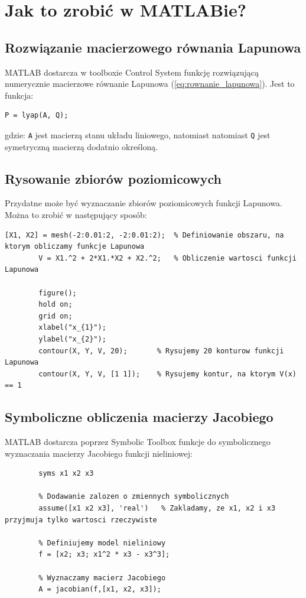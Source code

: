 \documentclass{article}
\begin{document}
\section{Jak to zrobić w MATLABie?}
    \subsection{Rozwiązanie macierzowego równania Lapunowa}
    MATLAB dostarcza w toolboxie Control System funkcję rozwiązującą numerycznie macierzowe równanie Lapunowa (\ref{eq:rownanie_lapunowa}).
    Jest to funkcja:
    \begin{lstlisting}[style=Matlab-editor]
        P = lyap(A, Q);
    \end{lstlisting}
    gdzie: \texttt{A} jest macierzą stanu układu liniowego, natomiast natomiast \texttt{Q} jest symetryczną macierzą dodatnio określoną.

    \subsection{Rysowanie zbiorów poziomicowych}
    Przydatne może być wyznaczanie zbiorów poziomicowych funkcji Lapunowa.
    Można to zrobić w następujący sposób:
    \begin{lstlisting}[style=Matlab-editor]
        [X1, X2] = mesh(-2:0.01:2, -2:0.01:2);  % Definiowanie obszaru, na ktorym obliczamy funkcje Lapunowa
        V = X1.^2 + 2*X1.*X2 + X2.^2;   % Obliczenie wartosci funkcji Lapunowa

        figure();
        hold on;
        grid on;
        xlabel("x_{1}");
        ylabel("x_{2}");
        contour(X, Y, V, 20);       % Rysujemy 20 konturow funkcji Lapunowa
        contour(X, Y, V, [1 1]);    % Rysujemy kontur, na ktorym V(x) == 1
    \end{lstlisting}

    \subsection{Symboliczne obliczenia macierzy Jacobiego}
    MATLAB dostarcza poprzez Symbolic Toolbox funkcje do symbolicznego wyznaczania macierzy Jacobiego funkcji nieliniowej:
    \begin{lstlisting}[style=Matlab-editor]
        % Definiowanie zmiennych symbolicznych
        syms x1 x2 x3

        % Dodawanie zalozen o zmiennych symbolicznych
        assume([x1 x2 x3], 'real')   % Zakladamy, ze x1, x2 i x3 przyjmuja tylko wartosci rzeczywiste

        % Definiujemy model nieliniowy
        f = [x2; x3; x1^2 * x3 - x3^3];

        % Wyznaczamy macierz Jacobiego
        A = jacobian(f,[x1, x2, x3]);
    \end{lstlisting}
\end{document}
